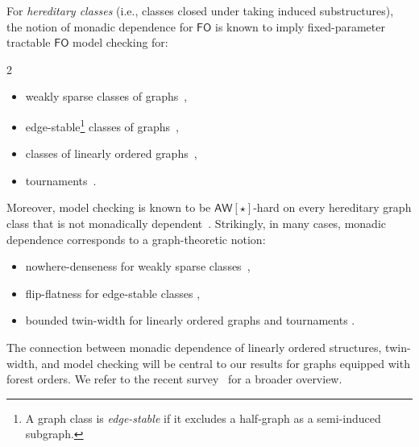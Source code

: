 \documentclass[1p,number,11pt]{elsarticle}
\theoremstyle{plain}
\renewcommand{\FO}{\ensuremath{\mathsf{FO}}}
\begin{document}
For \emph{hereditary classes} (i.e., classes closed under taking induced substructures), the notion of monadic dependence for {\FO} is known to 
imply fixed-parameter tractable $\FO$ model checking for: 
\begin{multicols}{2}
\begin{itemize}
    \item weakly sparse classes 
of graphs~\cite{dvorak2013,grohe2017},

\item edge-stable\footnote{A graph class is \emph{edge-stable} if it excludes a half-graph as a semi-induced subgraph.} classes of graphs~\cite{dreier2023structurally,dreier2024stable},

\item classes of linearly ordered graphs~\cite{bonnet2024twin},

\item tournaments~\cite{geniet2023first}.
\end{itemize}
\end{multicols}
%
Moreover, model checking is known to be $\mathsf{AW}[\star]$-hard on every hereditary graph class that is not monadically dependent~\cite{dreier2024flip}.
Strikingly, in many cases, monadic dependence corresponds to a graph-theoretic notion: 
\begin{itemize}
    \item nowhere-denseness for weakly sparse classes~\cite{ADLER2014322},
    \item flip-flatness for edge-stable classes \cite{flip-flatness},
    \item bounded twin-width for linearly ordered graphs and tournaments \cite{bonnet2024twin,geniet2023first}.
\end{itemize}
 
The connection between monadic dependence of linearly ordered structures, twin-width, and model checking will be central to our results for graphs equipped with forest orders.
We refer to the recent survey~\cite{pilipczuk2025survey} for a broader overview.

\end{document}
